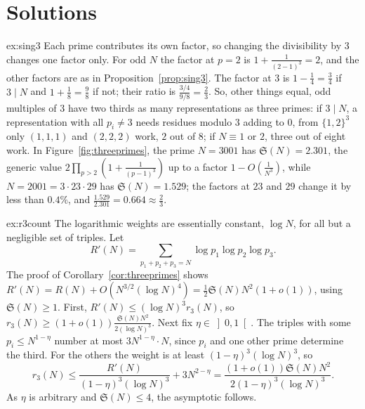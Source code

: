 \section{Solutions}

\begin{solution}{ex:sing3}
\idea Each prime contributes its own factor, so changing the divisibility by $3$ changes one factor only.
\writeup For odd $N$ the factor at $p=2$ is $1+\frac1{(2-1)^3}=2$, and the other factors are as in Proposition~\ref{prop:sing3}. The factor at $3$ is $1-\frac14=\frac34$ if $3\mid N$ and $1+\frac18=\frac98$ if not; their ratio is $\frac{3/4}{9/8}=\frac23$. So, other things equal, odd multiples of $3$ have two thirds as many representations as three primes: if $3\mid N$, a representation with all $p_i\ne3$ needs residues modulo $3$ adding to $0$, from $\{1,2\}^3$ only $(1,1,1)$ and $(2,2,2)$ work, $2$ out of $8$; if $N\equiv1$ or $2$, three out of eight work. In Figure~\ref{fig:threeprimes}, the prime $N=3001$ has $\mathfrak S(N)=2.301$, the generic value $2\prod_{p>2}(1+\frac1{(p-1)^3})$ up to a factor $1-O(\frac1{N^3})$, while $N=2001=3\cdot23\cdot29$ has $\mathfrak S(N)=1.529$; the factors at $23$ and $29$ change it by less than $0.4\%$, and $\frac{1.529}{2.301}=0.664\approx\frac23$.
\end{solution}
\begin{solution}{ex:r3count}
\idea The logarithmic weights are essentially constant, $\log N$, for all but a negligible set of triples.
\writeup Let
\[
R'(N)=\sum_{p_1+p_2+p_3=N}\log p_1\log p_2\log p_3.
\]
The proof of Corollary~\ref{cor:threeprimes} shows $R'(N)=R(N)+O(N^{3/2}(\log N)^4)=\frac12\mathfrak S(N)N^2(1+o(1))$, using $\mathfrak S(N)\ge1$. First, $R'(N)\le(\log N)^3r_3(N)$, so $r_3(N)\ge(1+o(1))\frac{\mathfrak S(N)N^2}{2(\log N)^3}$. Next fix $\eta\in\left]0,1\right[$. The triples with some $p_i\le N^{1-\eta}$ number at most $3N^{1-\eta}\cdot N$, since $p_i$ and one other prime determine the third. For the others the weight is at least $(1-\eta)^3(\log N)^3$, so
\[
r_3(N)\le\frac{R'(N)}{(1-\eta)^3(\log N)^3}+3N^{2-\eta}=\frac{(1+o(1))\mathfrak S(N)N^2}{2(1-\eta)^3(\log N)^3}.
\]
As $\eta$ is arbitrary and $\mathfrak S(N)\le4$, the asymptotic follows.
\end{solution}
